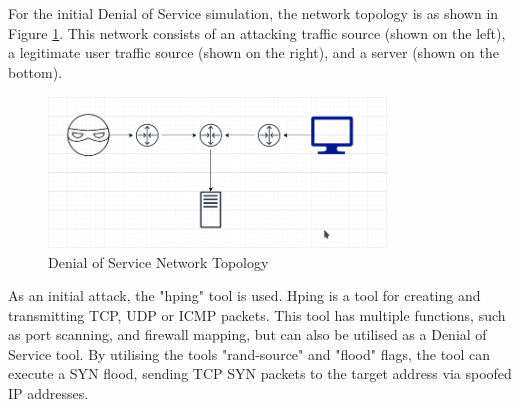 For the initial Denial of Service simulation, the network topology is as shown
in Figure \ref{fig:dosNetwork}. This network consists of an attacking traffic
source (shown on the left), a legitimate user traffic source (shown on the
right), and a server (shown on the bottom).

\begin{figure}[H]
	\centering
	\includegraphics[width=0.8\textwidth]{images/dosNetwork}
	\caption{Denial of Service Network Topology}
	\label{fig:dosNetwork}
\end{figure}

As an initial attack, the "hping" tool is used. Hping is a tool for creating and
transmitting TCP, UDP or ICMP packets. This tool has multiple functions, such as
port scanning, and firewall mapping, but can also be utilised as a Denial of
Service tool. By utilising the tools "rand-source" and "flood" flags, the tool
can execute a SYN flood, sending TCP SYN packets to the target address via
spoofed IP addresses.
